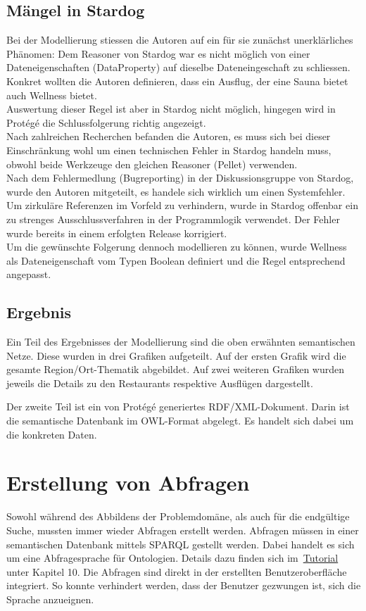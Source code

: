 \subsection{Mängel in Stardog}
\label{subsec:loesung_modellierung_maengel_stardog}
Bei der Modellierung stiessen die Autoren auf ein für sie zunächst unerklärliches Phänomen: Dem Reasoner von Stardog war es nicht möglich von einer Dateneigenschaften (DataProperty) auf dieselbe Dateneingeschaft zu schliessen. Konkret wollten die Autoren definieren, dass ein Ausflug, der eine Sauna bietet auch Wellness bietet.\\
Auswertung dieser Regel ist aber in Stardog nicht möglich, hingegen wird in Protégé die Schlussfolgerung richtig angezeigt.\\
Nach zahlreichen Recherchen befanden die Autoren, es muss sich bei dieser Einschränkung wohl um einen technischen Fehler in Stardog handeln muss, obwohl beide Werkzeuge den gleichen Reasoner (Pellet) verwenden.\\
Nach dem Fehlermedlung (Bugreporting) in der Diskussionsgruppe von Stardog, wurde den Autoren mitgeteilt, es handele sich wirklich um einen Systemfehler. Um zirkuläre Referenzen im Vorfeld zu verhindern, wurde in Stardog offenbar ein zu strenges Ausschlussverfahren in der Programmlogik verwendet. Der Fehler wurde bereits in einem erfolgten Release korrigiert.\\
Um die gewünschte Folgerung dennoch modellieren zu können, wurde Wellness als Dateneigenschaft vom Typen Boolean definiert und die Regel entsprechend angepasst.

\subsection{Ergebnis}
\label{subsec:loesung_modellierung_ergebnis}
Ein Teil des Ergebnisses der Modellierung sind die oben erwähnten semantischen Netze. Diese wurden in drei Grafiken aufgeteilt. Auf der ersten Grafik wird die gesamte Region/Ort-Thematik abgebildet. Auf zwei weiteren Grafiken wurden jeweils die Details zu den Restaurants respektive Ausflügen dargestellt.

Der zweite Teil ist ein von Protégé generiertes RDF/XML-Dokument. Darin ist die semantische Datenbank im OWL-Format abgelegt. Es handelt sich dabei um die konkreten Daten.

\section{Erstellung von Abfragen}
\label{sec:loesung_sparql}
Sowohl während des Abbildens der Problemdomäne, als auch für die endgültige Suche, mussten immer wieder Abfragen erstellt werden. Abfragen müssen in einer semantischen Datenbank mittels SPARQL gestellt werden. Dabei handelt es sich um eine Abfragesprache für Ontologien. Details dazu finden sich im~\hyperref[sec:anhang:tutorial_dokument]{Tutorial} unter Kapitel 10. Die Abfragen sind direkt in der erstellten Benutzeroberfläche integriert. So konnte verhindert werden, dass der Benutzer gezwungen ist, sich die Sprache anzueignen.

